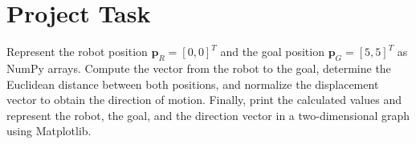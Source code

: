\documentclass[10pt,twocolumn,a4paper]{article}
\begin{document}
\section{Project Task}

Represent the robot position
\(\mathbf{p}_R = [0,0]^T\)
and the goal position
\(\mathbf{p}_G = [5,5]^T\)
as NumPy arrays. Compute the vector from the robot to the goal, determine the 
Euclidean distance between both positions, and normalize the displacement vector 
to obtain the direction of motion. Finally, print the calculated values and 
represent the robot, the goal, and the direction vector in a two-dimensional 
graph using Matplotlib.
\end{document}
